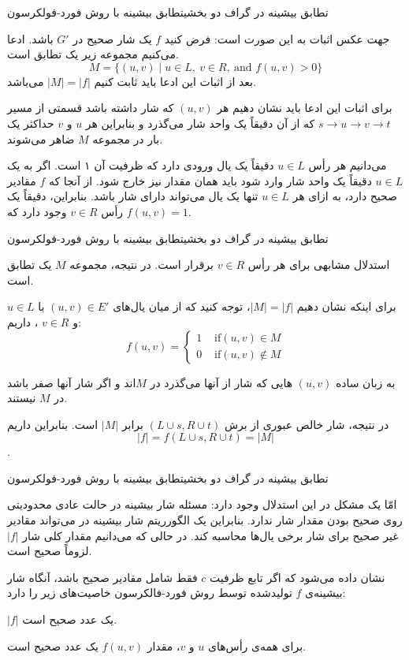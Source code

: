 \begin{itemframe-s}{تطابق بیشینه در گراف دو بخشی}{تطابق بیشینه با روش فورد-فولکرسون}
\item[-]
جهت عکس اثبات به این صورت است:
فرض کنید $f$ یک شار صحیح در $G'$ باشد. ادعا می‌کنیم مجموعه زیر یک تطابق است.
$$
M = \{ (u, v) \mid u \in L,\ v \in R,\ \text{and } f(u,v) > 0 \}
$$
بعد از اثبات این ادعا باید ثابت کنیم $|M| = |f|$ می‌باشد.
\item[-]
برای اثبات این ادعا باید نشان دهیم هر
$ (u, v) $
که شار داشته باشد قسمتی از مسیر
$s \to u \to v \to t$
که از آن دقیقاً یک واحد شار می‌گذرد و بنابراین هر $u$ و $v$ حداکثر یک بار در مجموعه $M$ ضاهر می‌شوند.
\item[-]
می‌دانیم هر رأس
 $u \in L$
دقیقاً یک یال ورودی دارد که ظرفیت آن ۱ است.
اگر به یک  $u \in L$  دقیقاً یک واحد شار وارد شود باید همان مقدار نیز خارج شود.
از آنجا که $f$ مقادیر صحیح دارد، به ازای هر $u \in L$ تنها یک یال می‌تواند دارای شار باشد. بنابراین، دقیقاً یک رأس $v \in R$ وجود دارد که
$f(u, v) = 1$.

\end{itemframe-s}


\begin{itemframe-s}{تطابق بیشینه در گراف دو بخشی}{تطابق بیشینه با روش فورد-فولکرسون}
\item[-]
استدلال مشابهی برای هر رأس $v \in R$ برقرار است. در نتیجه، مجموعه $M$ یک تطابق است.

\item[-]
برای اینکه نشان دهیم $|M| = |f|$، توجه کنید که از میان یال‌های
$(u, v) \in E'$
 با
$u \in L$
 و
$v \in R$
، داریم:
$$
f(u,v) =
\begin{cases}
1 & \text{ if} (u,v) \in M \\
0 & \text{ if} (u,v) \notin M
\end{cases}
$$

به زبان ساده $(u,v)$ هایی که شار از آنها می‌گذرد در  $M$‌اند و اگر شار آنها صفر باشد در  $M$ نیستند.
\item[-]
در نتیجه، شار خالص عبوری از برش $(L \cup {s}, R \cup {t})$ برابر $|M|$ است.
بنابراین داریم
$$|f| = f(L \cup {s}, R \cup {t}) = |M|$$.
\end{itemframe-s}


\begin{itemframe-s}{تطابق بیشینه در گراف دو بخشی}{تطابق بیشینه با روش فورد-فولکرسون}
\item[-]
امّا یک مشکل در این استدلال وجود دارد:‌ مسئله شار بیشینه در حالت عادی محدودیتی روی صحیح بودن مقدار شار ندارد. بنابراین یک الگورریتم شار بیشینه در می‌تواند مقادیر غیر صحیح برای شار برخی یال‌ها محاسبه کند. در حالی که می‌دانیم مقدار کلی شار $|f|$ لزوماً صحیح است.
\item[-]
نشان داده می‌شود که اگر تابع ظرفیت $c$ فقط شامل مقادیر صحیح باشد، آنگاه شار بیشینه‌ی $f$ تولیدشده توسط روش فورد-فالکرسون خاصیت‌های زیر را دارد:
\item[1]
$|f|$
یک عدد صحیح است.
\item[2]
 برای همه‌ی رأس‌های $u$ و $v$، مقدار $f(u, v)$ یک عدد صحیح است.
\end{itemframe-s}


